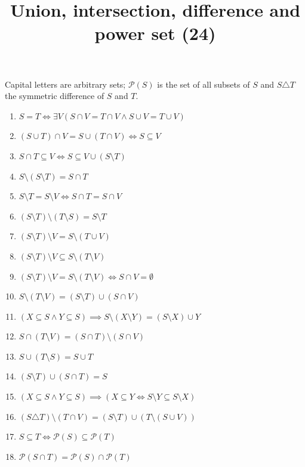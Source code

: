 \documentclass[11pt,a4paper]{article}
\title{Union, intersection, difference and power set (24)}
\author{}
\date{}
\begin{document}
\maketitle
Capital letters are arbitrary sets; $\mathcal{P}(S)$ is the set of all subsets of $S$ and $S \triangle T$ the symmetric difference of $S$ and $T$.

\begin{enumerate}
\item $\displaystyle S = T \iff \exists V \left( S \cap V = T \cap V \land S \cup V = T \cup V \right)$
\item $\displaystyle (S \cup T) \cap V = S \cup (T \cap V) \iff S \subseteq V$
\item $\displaystyle S \cap T \subseteq V \iff S \subseteq V \cup (S \setminus T)$
\item $\displaystyle S \setminus (S \setminus T) = S \cap T$
\item $\displaystyle S \setminus T = S \setminus V \iff S \cap T = S \cap V$
\item $\displaystyle (S \setminus T) \setminus (T \setminus S) = S \setminus T$
\item $\displaystyle (S \setminus T) \setminus V = S \setminus (T \cup V)$
\item $\displaystyle (S \setminus T) \setminus V \subseteq S \setminus (T \setminus V)$
\item $\displaystyle (S \setminus T) \setminus V = S \setminus (T \setminus V) \iff S \cap V = \emptyset$
\item $\displaystyle S \setminus (T \setminus V) = (S \setminus T) \cup (S \cap V)$
\item $\displaystyle (X \subseteq S \land Y \subseteq S) \implies S \setminus (X \setminus Y) = (S \setminus X) \cup Y$
\item $\displaystyle S \cap (T \setminus V) = (S \cap T) \setminus (S \cap V)$
\item $\displaystyle S \cup (T \setminus S) = S \cup T$
\item $\displaystyle (S \setminus T) \cup (S \cap T) = S$
\item $\displaystyle (X \subseteq S \land Y \subseteq S) \implies (X \subseteq Y \iff S \setminus Y \subseteq S \setminus X)$
\item $\displaystyle (S \triangle T) \setminus (T \cap V) = (S \setminus T) \cup (T \setminus (S \cup V))$
\item $\displaystyle S \subseteq T \iff \mathcal{P}(S) \subseteq \mathcal{P}(T)$
\item $\displaystyle \mathcal{P}(S \cap T) = \mathcal{P}(S) \cap \mathcal{P}(T)$

\end{enumerate}
\end{document}
